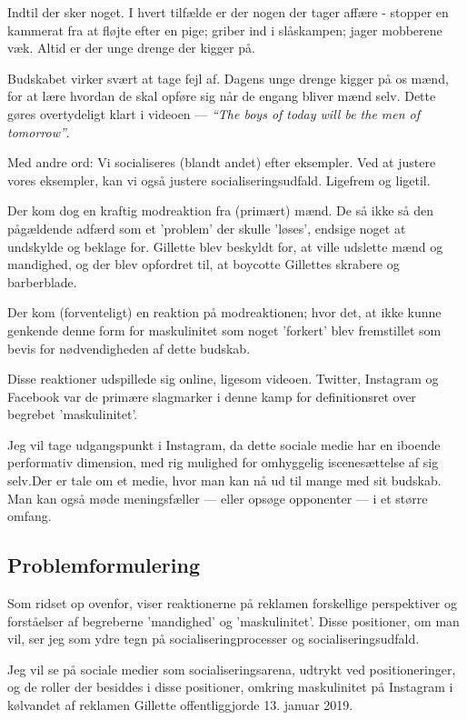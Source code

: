 Indtil der sker noget. I hvert tilfælde er der nogen der tager
affære - stopper en kammerat fra at fløjte efter en pige; griber
ind i slåskampen; jager mobberene væk. Altid er der unge drenge
der kigger på.

Budskabet virker svært at tage fejl af. Dagens unge drenge kigger
på os mænd, for at lære hvordan de skal opføre sig når de engang
bliver mænd selv. Dette gøres overtydeligt klart i videoen --- 
\textit{“The boys of today will be the men of tomorrow”}.

Med andre ord: Vi socialiseres (blandt andet) efter eksempler. Ved
at justere vores eksempler, kan vi også justere
socialiseringsudfald. Ligefrem og ligetil.

Der kom dog en kraftig modreaktion fra (primært) mænd.
De så ikke så den pågældende adfærd som et 'problem' der skulle
'løses', endsige noget at undskylde og beklage for. Gillette blev
beskyldt for, at ville udslette mænd og mandighed, og der blev
opfordret til, at boycotte Gillettes skrabere og barberblade. 

Der kom (forventeligt) en reaktion på modreaktionen; hvor det, at
ikke kunne genkende denne form for maskulinitet som noget
'forkert' blev fremstillet som bevis for nødvendigheden af dette
budskab. 

Disse reaktioner udspillede sig online, ligesom videoen. Twitter,
Instagram og Facebook var de primære slagmarker i denne kamp for
definitionsret over begrebet 'maskulinitet'.

Jeg vil tage udgangspunkt i Instagram, da dette sociale medie har
en iboende performativ dimension, med rig mulighed for omhyggelig
iscenesættelse af sig selv.Der er tale om et medie, hvor man kan
nå ud til mange med sit budskab. Man kan også møde meningsfæller —
eller opsøge opponenter — i et større omfang.

\subsection{Problemformulering}

Som ridset op ovenfor, viser reaktionerne på reklamen forskellige
perspektiver og forståelser af begreberne 'mandighed' og
'maskulinitet'. Disse positioner, om man vil, ser jeg som ydre
tegn på socialiseringprocesser og socialiseringsudfald. 

Jeg vil se på sociale medier som socialiseringsarena, udtrykt ved
positioneringer, og  de roller der besiddes i disse positioner, 
omkring maskulinitet på Instagram i kølvandet af
reklamen Gillette offentliggjorde 13. januar 2019. 

